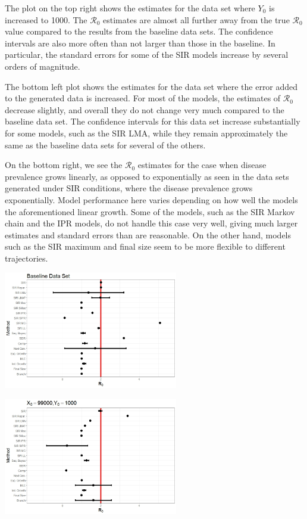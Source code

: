 \documentclass[12pt]{article}
\newcommand{\rr}{\ensuremath{\mathcal{R}_0}}
\begin{document}
The plot on the top right shows the estimates for the data set where $Y_0$ is increased to 1000. The $\rr$ estimates are almost all further away from the true $\rr$ value compared to the results from the baseline data sets. The confidence intervals are also more often than not larger than those in the baseline. In particular, the standard errors for some of the SIR models increase by several orders of magnitude.

The bottom left plot shows the estimates for the data set where the error added to the generated data is increased. For most of the models, the estimates of $\rr$ decrease slightly, and overall they do not change very much compared to the baseline data set. The confidence intervals for this data set increase substantially for some models, such as the SIR LMA, while they remain approximately the same as the baseline data sets for several of the others.

On the bottom right, we see the $\rr$ estimates for the case when disease prevalence grows linearly, as opposed to exponentially as seen in the data sets generated under SIR conditions, where the disease prevalence grows exponentially. Model performance here varies depending on how well the models the aforementioned linear growth. Some of the models, such as the SIR Markov chain and the IPR models, do not handle this case very well, giving much larger estimates and standard errors than are reasonable. On the other hand, models such as the SIR maximum and final size seem to be more flexible to different trajectories.

\begin{minipage}{0.5\linewidth}
	\includegraphics[width=3in]{BaselineFP.jpeg}
\end{minipage}
\begin{minipage}{0.5\linewidth}
	\includegraphics[width=3in]{StartPopFP.jpeg}
\end{minipage}
\end{document}

